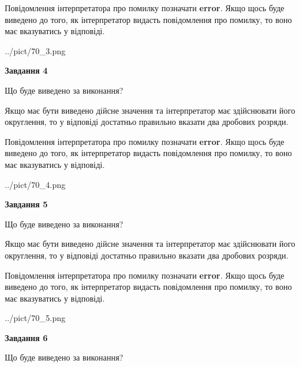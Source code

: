 \documentclass[12pt, ukrainian]{article}
\begin{document}
{\begin {Large}
Повідомлення інтерпретатора про помилку позначати \textbf{error}.
Якщо щось буде виведено до того, як інтерпретатор видасть повідомлення про помилку, 
то воно має вказуватись у відповіді. \par

\begin{center}
	{../pict/70_3.png}
\end{center}
\newpage

{\begin {center}\textbf{Завдання 4}\end {center}}\par
Що буде виведено за виконання? \par

Якщо має бути виведено дійсне значення та інтерпретатор має здійснювати його округлення, 
то у відповіді достатньо правильно вказати два дробових розряди.

Повідомлення інтерпретатора про помилку позначати \textbf{error}.
Якщо щось буде виведено до того, як інтерпретатор видасть повідомлення про помилку, 
то воно має вказуватись у відповіді. \par

\begin{center}
	{../pict/70_4.png}
\end{center}
\newpage

{\begin {center}\textbf{Завдання 5}\end {center}}\par
Що буде виведено за виконання? \par

Якщо має бути виведено дійсне значення та інтерпретатор має здійснювати його округлення, 
то у відповіді достатньо правильно вказати два дробових розряди.

Повідомлення інтерпретатора про помилку позначати \textbf{error}.
Якщо щось буде виведено до того, як інтерпретатор видасть повідомлення про помилку, 
то воно має вказуватись у відповіді. \par

\begin{center}
	{../pict/70_5.png}
\end{center}
\newpage

{\begin {center}\textbf{Завдання 6}\end {center}}\par
Що буде виведено за виконання? \par


\end{Large}}
\end{document}
